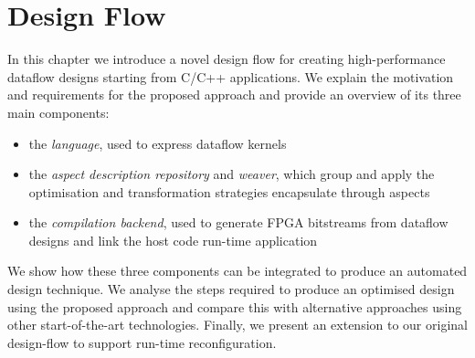 \chapter{Design Flow}
\label{sec:design-flow}

In this chapter we introduce a novel design flow for creating
high-performance dataflow designs starting from C/C++ applications. We
explain the motivation and requirements for the proposed approach and
provide an overview of its three main components:
\begin{itemize}
\item the \emph{\FAST{} language}, used to express dataflow kernels
\item the \emph{aspect description repository} and \emph{weaver}, which group
  and apply the optimisation and transformation strategies encapsulate
  through aspects
\item the \emph{compilation backend}, used to generate FPGA bitstreams
  from dataflow designs and link the host code run-time
  application
\end{itemize}
We show how these three components can be integrated to produce an
automated design technique. We analyse the steps required to produce
an optimised design using the proposed approach and compare this with
alternative approaches using other start-of-the-art
technologies. Finally, we present an extension to our original
design-flow to support run-time reconfiguration.

